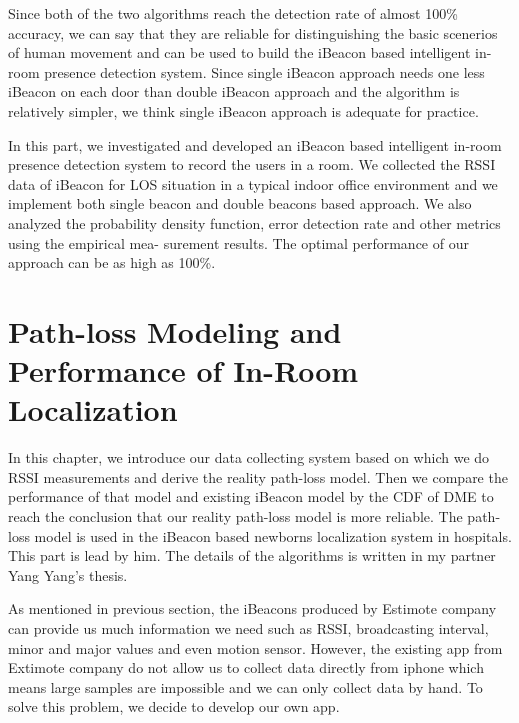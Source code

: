 \documentclass[12pt]{report}
\begin{document}
Since both of the two algorithms reach the detection rate of almost 100\% accuracy, we can say that they are reliable for distinguishing the basic scenerios of human movement and can be used to build the iBeacon based intelligent in-room
presence detection system. Since single iBeacon approach needs one less iBeacon on each door than double iBeacon approach and the algorithm is relatively simpler, we think single iBeacon approach is adequate for practice.

In this part, we investigated and developed an iBeacon based intelligent in-room presence detection system to record the users in a room. We collected the RSSI data of iBeacon for LOS situation in a typical indoor office environment and we implement both single beacon and double beacons based approach. We also analyzed the probability density function, error detection rate and other metrics using the empirical mea- surement results. The optimal performance of our approach can be as high as 100\%.


\chapter{Path-loss Modeling and Performance of In-Room Localization}
In this chapter, we introduce our data collecting system based on which we do RSSI measurements and derive the reality path-loss model. Then we compare the performance of that model and existing iBeacon model by the CDF of DME to reach the conclusion that our reality path-loss model is more reliable. The path-loss model is used in the iBeacon based newborns localization system in hospitals. This part is lead by him. The details of the algorithms is written in my partner Yang Yang's thesis.

As mentioned in previous section, the iBeacons produced by Estimote company can provide us much information we need such as RSSI, broadcasting interval, minor and major values and even motion sensor. However, the existing app from Extimote company do not allow us to collect data directly from iphone which means large samples are impossible and we can only collect data by hand. To solve this problem, we decide to develop our own app.
\end{document}
